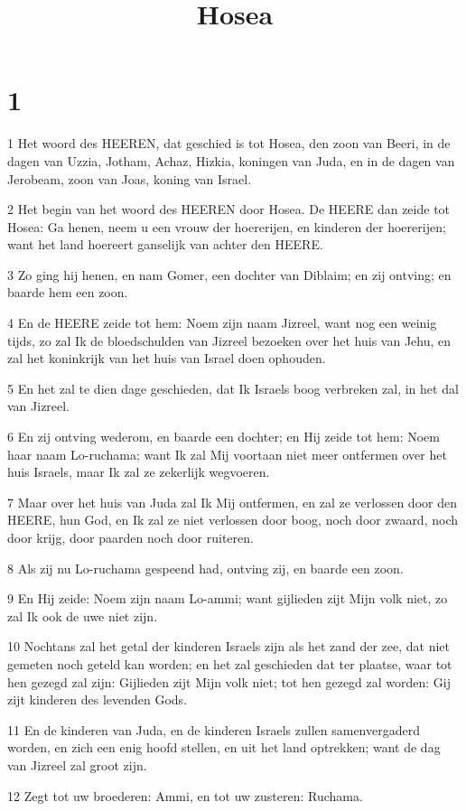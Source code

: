 

\title{Hosea}



\chapter{1}

\par 1 Het woord des HEEREN, dat geschied is tot Hosea, den zoon van Beeri, in de dagen van Uzzia, Jotham, Achaz, Hizkia, koningen van Juda, en in de dagen van Jerobeam, zoon van Joas, koning van Israel.
\par 2 Het begin van het woord des HEEREN door Hosea. De HEERE dan zeide tot Hosea: Ga henen, neem u een vrouw der hoererijen, en kinderen der hoererijen; want het land hoereert ganselijk van achter den HEERE.
\par 3 Zo ging hij henen, en nam Gomer, een dochter van Diblaim; en zij ontving; en baarde hem een zoon.
\par 4 En de HEERE zeide tot hem: Noem zijn naam Jizreel, want nog een weinig tijds, zo zal Ik de bloedschulden van Jizreel bezoeken over het huis van Jehu, en zal het koninkrijk van het huis van Israel doen ophouden.
\par 5 En het zal te dien dage geschieden, dat Ik Israels boog verbreken zal, in het dal van Jizreel.
\par 6 En zij ontving wederom, en baarde een dochter; en Hij zeide tot hem: Noem haar naam Lo-ruchama; want Ik zal Mij voortaan niet meer ontfermen over het huis Israels, maar Ik zal ze zekerlijk wegvoeren.
\par 7 Maar over het huis van Juda zal Ik Mij ontfermen, en zal ze verlossen door den HEERE, hun God, en Ik zal ze niet verlossen door boog, noch door zwaard, noch door krijg, door paarden noch door ruiteren.
\par 8 Als zij nu Lo-ruchama gespeend had, ontving zij, en baarde een zoon.
\par 9 En Hij zeide: Noem zijn naam Lo-ammi; want gijlieden zijt Mijn volk niet, zo zal Ik ook de uwe niet zijn.
\par 10 Nochtans zal het getal der kinderen Israels zijn als het zand der zee, dat niet gemeten noch geteld kan worden; en het zal geschieden dat ter plaatse, waar tot hen gezegd zal zijn: Gijlieden zijt Mijn volk niet; tot hen gezegd zal worden: Gij zijt kinderen des levenden Gods.
\par 11 En de kinderen van Juda, en de kinderen Israels zullen samenvergaderd worden, en zich een enig hoofd stellen, en uit het land optrekken; want de dag van Jizreel zal groot zijn.
\par 12 Zegt tot uw broederen: Ammi, en tot uw zusteren: Ruchama.

